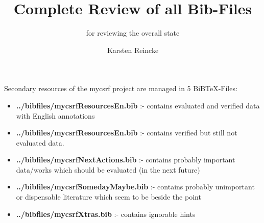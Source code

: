\documentclass[DIV=calc,BCOR=5mm,11pt,headings=small,oneside,abstract=true,toc=bib]{scrartcl}
\begin{document}
\nocite{*}

\titlehead{Integrationtest: English Configuration}
\subject{BiBTeX-Files}
\title{Complete Review of all Bib-Files}
\subtitle{for reviewing the overall state}
\author{Karsten Reincke}
\maketitle

Secondary resources of the mycsrf project are managed in 5 BiBTeX-Files:

\begin{itemize}
  \item {\bfseries ../bibfiles/mycsrfResourcesEn.bib} :- contains evaluated and
  verified data with English annotations
  \item {\bfseries ../bibfiles/mycsrfResourcesEn.bib} :- contains verified but
  still not evaluated data.
  \item {\bfseries ../bibfiles/mycsrfNextActions.bib} :- contains
  probably important data/works which should be evaluated (in the next future)
  \item {\bfseries ../bibfiles/mycsrfSomedayMaybe.bib} :-
  contains probably unimportant or dispensable literature which seem to be beside the point
  \item {\bfseries ../bibfiles/mycsrfXtras.bib} :- contains ignorable hints
\end{itemize}

\small



\end{document}
